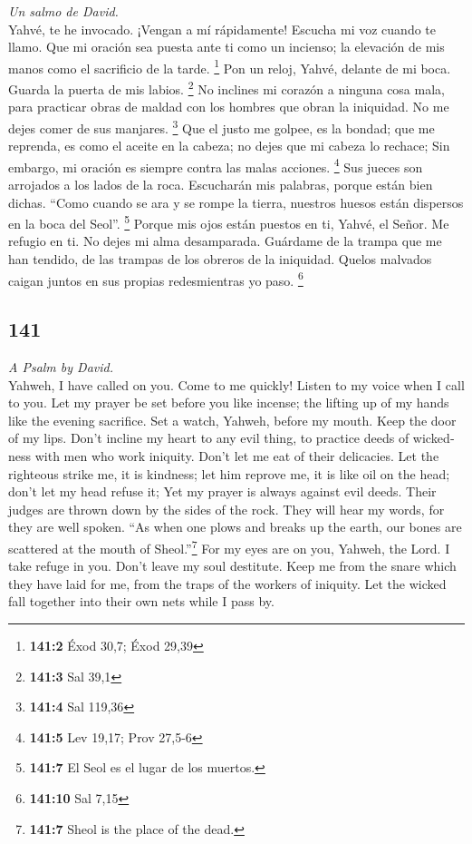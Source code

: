 \begin{paracol}{2}
\emph{Un salmo de David.}\\
 Yahvé, te he invocado. ¡Vengan a mí rápidamente! Escucha
mi voz cuando te llamo.  Que mi oración sea puesta ante ti
como un incienso; la elevación de mis manos como el sacrificio de la
tarde. \footnote{\textbf{141:2} Éxod 30,7; Éxod 29,39} 
Pon un reloj, Yahvé, delante de mi boca. Guarda la puerta de mis labios.
\footnote{\textbf{141:3} Sal 39,1}  No inclines mi corazón
a ninguna cosa mala, para practicar obras de maldad con los hombres que
obran la iniquidad. No me dejes comer de sus manjares. \footnote{\textbf{141:4}
  Sal 119,36}  Que el justo me golpee, es la bondad; que
me reprenda, es como el aceite en la cabeza; no dejes que mi cabeza lo
rechace; Sin embargo, mi oración es siempre contra las malas acciones.
\footnote{\textbf{141:5} Lev 19,17; Prov 27,5-6}  Sus
jueces son arrojados a los lados de la roca. Escucharán mis palabras,
porque están bien dichas.  ``Como cuando se ara y se rompe
la tierra, nuestros huesos están dispersos en la boca del Seol''.
\footnote{\textbf{141:7} El Seol es el lugar de los muertos.}
 Porque mis ojos están puestos en ti, Yahvé, el Señor. Me
refugio en ti. No dejes mi alma desamparada.  Guárdame de
la trampa que me han tendido, de las trampas de los obreros de la
iniquidad.  Quelos malvados caigan juntos en sus propias
redesmientras yo paso. \footnote{\textbf{141:10} Sal 7,15}

\switchcolumn
\begin{otherlanguage}{english}

\hypertarget{section-281}{%
\section{141}\label{section-281}}

\emph{A Psalm by David.}\\
 Yahweh, I have called on you. Come to me quickly! Listen
to my voice when I call to you.  Let my prayer be set
before you like incense; the lifting up of my hands like the evening
sacrifice.  Set a watch, Yahweh, before my mouth. Keep the
door of my lips.  Don't incline my heart to any evil
thing, to practice deeds of wickedness with men who work iniquity. Don't
let me eat of their delicacies.  Let the righteous strike
me, it is kindness; let him reprove me, it is like oil on the head;
don't let my head refuse it; Yet my prayer is always against evil deeds.
 Their judges are thrown down by the sides of the rock.
They will hear my words, for they are well spoken.  ``As
when one plows and breaks up the earth, our bones are scattered at the
mouth of Sheol.''\footnote{\textbf{141:7} Sheol is the place of the
  dead.}  For my eyes are on you, Yahweh, the Lord. I take
refuge in you. Don't leave my soul destitute.  Keep me
from the snare which they have laid for me, from the traps of the
workers of iniquity.  Let the wicked fall together into
their own nets while I pass by.


\end{otherlanguage}
\end{paracol}
